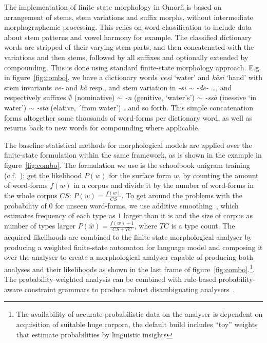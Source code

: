 \documentclass[preprint]{flammie}
\begin{document}
The implementation of finite-state morphology in Omorfi is based on
arrangement of stems, stem variations and suffix morphs, without
intermediate morphographemic processing. This relies on word classification
to include data about stem patterns and vowel harmony for example. The
classified dictionary words are stripped of their varying stem parts, and
then concatenated with the variations and then stems, followed by all
suffixes and optionally extended by compounding. This is done using standard
finite-state morphology approach. E.g.  in figure~\ref{fig:combo}, we have a
dictionary words \textit{vesi} `water' and \textit{käsi} `hand' with stem
invariants \textit{ve-} and \textit{kä} resp., and stem variation in
\textit{-si} $\sim$ \textit{-de-} \ldots, and respectively suffixes
$\emptyset$ (nominative) $\sim$ \textit{-n} (genitive, `water's') $\sim$
\textit{-ssä} (inessive `in water')  $\sim$ \textit{-stä} (elative, ´from
water') \ldots and so forth. This simple concatenation forms altogether
some thousands of word-forms per dictionary word, as well as returns back to
new words for compounding where applicable.

The baseline statistical methods for morphological models are applied over
the finite-state formulation within the same framework, as is shown in the
example in figure~\ref{fig:combo}.  The formulation we use is the schoolbook
unigram training (c.f.~\cite{manning1999foundations}): get the likelihood
$P(w)$ for the surface form $w$, by counting the amount of word-forms $f(w)$
in a corpus and divide it by the number of word-forms in the whole corpus
$CS$: $P(w) = \frac{f(w)}{CS}$.  To get around the problems with the
probability of $0$ for unseen word-forms, we use additive
smoothing~\citep{chen1999empirical}, which estimates frequency of each type
as $1$ larger than it is and the size of corpus as number of types larger
$P(\hat w) = \frac{f(w) + 1}{CS + TC}$, where $TC$ is a type count. The
acquired likelihoods are combined to the finite-state morphological analyser
by producing a weighted finite-state automaton for language model and
composing it over the analyser to create a morphological analyser capable of
producing both analyses and their likelihoods as shown in the last frame of
figure~\ref{fig:combo}.\footnote{The availability of accurate probabilistic
data on the analyser is dependent on acquisition of suitable huge corpora,
the default build includes ``toy'' weights that estimate probabilities by
linguistic insights}. The probability-weighted analysis can be combined with
rule-based probability-aware constraint grammars to produce robust
disambiguating analysers~\cite{pirinen2015using}.
\end{document}
